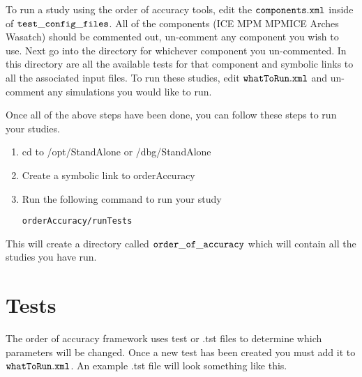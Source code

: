 To run a study using the order of accuracy tools, edit the $\TT{components.xml}$ inside of $\TT{test\_config\_files}$. All of the components (ICE MPM MPMICE Arches Wasatch) should be commented out, un-comment any component you wish to use. Next go into the directory for whichever component you un-commented. In this directory are all the available tests for that component and symbolic links to all the associated input files. To run these studies, edit $\TT{whatToRun.xml}$ and un-comment any simulations you would like to run.

Once all of the above steps have been done, you can follow these steps to run your studies.
\begin{enumerate}

\item cd to /opt/StandAlone or /dbg/StandAlone
\item Create a symbolic link to orderAccuracy \\
\item Run the following command to run your study
\begin{verbatim}
orderAccuracy/runTests
\end{verbatim}

\end{enumerate}

This will create a directory called $\TT{order\_of\_accuracy}$ which will contain all the studies you have run.

\section{Tests}

The order of accuracy framework uses test or .tst files to determine which parameters will be changed. Once a new test has been created you must add it to $\TT{whatToRun.xml}$. An example .tst file will look something like this.

